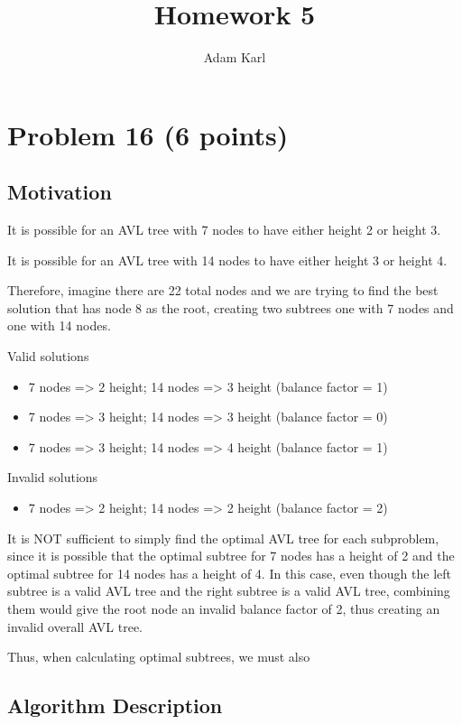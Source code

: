\documentclass[a4paper]{article}
\title{Homework 5}
\author{Adam Karl}
\begin{document}
\maketitle

\section{Problem 16 (6 points)}
\subsection{Motivation}

It is possible for an AVL tree with 7 nodes to have either height 2 or height 3. 

It is possible for an AVL tree with 14 nodes to have either height 3 or height 4. 

Therefore, imagine there are 22 total nodes and we are trying to find the best solution that has node 8 as the root, creating two subtrees one with 7 nodes and one with 14 nodes. 

Valid solutions
\begin{itemize}
    \item 7 nodes => 2 height; 14 nodes => 3 height (balance factor = 1)
    \item 7 nodes => 3 height; 14 nodes => 3 height (balance factor = 0)
    \item 7 nodes => 3 height; 14 nodes => 4 height (balance factor = 1)
\end{itemize}

Invalid solutions
\begin{itemize}
    \item 7 nodes => 2 height; 14 nodes => 2 height (balance factor = 2)
\end{itemize}
It is NOT sufficient to simply find the optimal AVL tree for each subproblem, since it is possible that the optimal subtree for 7 nodes has a height of 2 and the optimal subtree for 14 nodes has a height of 4. In this case, even though the left subtree is a valid AVL tree and the right subtree is a valid AVL tree, combining them would give the root node an invalid balance factor of 2, thus creating an invalid overall AVL tree.

Thus, when calculating optimal subtrees, we must also 

\subsection{Algorithm Description}
\end{document}

